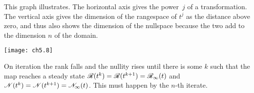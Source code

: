 This graph illustrates.
The horizontal axis gives the power~$j$ of a transformation.
The vertical axis gives
the dimension of the rangespace of $t^j$
as the distance above zero, and thus also shows the dimension of the 
nullspace because the two add to the dimension $n$ of the domain.
\begin{center}
  \texttt{[image: ch5.8]}
\end{center}
On iteration 
the rank falls and the nullity rises
until there is some $k$ such that 
the map reaches a steady state
$\mathscr{R}(t^k)=\mathscr{R}(t^{k+1})=\mathscr{R}_\infty(t)$
and $\mathscr{N}(t^k)=\mathscr{N}(t^{k+1})=\mathscr{N}_\infty(t)$.
This must happen by the $n$-th iterate.

